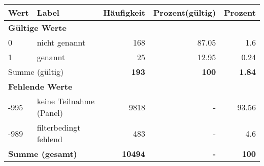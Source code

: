      \begin{longtable}{lXrrr}
     \toprule
     \textbf{Wert} & \textbf{Label} & \textbf{Häufigkeit} & \textbf{Prozent(gültig)} & \textbf{Prozent} \\
     \endhead
     \midrule
     \multicolumn{5}{l}{\textbf{Gültige Werte}}\\

     0 &
     \multicolumn{1}{X}{ nicht genannt   } &


       \num{168} &
       \num[round-mode=places,round-precision=2]{87,05} &
         \num[round-mode=places,round-precision=2]{1,6} \\

     1 &
     \multicolumn{1}{X}{ genannt   } &


       \num{25} &
       \num[round-mode=places,round-precision=2]{12,95} &
         \num[round-mode=places,round-precision=2]{0,24} \\
     \midrule
     \multicolumn{2}{l}{Summe (gültig)} &
       \textbf{\num{193}} &
     \textbf{100} &
       \textbf{\num[round-mode=places,round-precision=2]{1,84}} \\
     \multicolumn{5}{l}{\textbf{Fehlende Werte}}\\
       -995 &
       keine Teilnahme (Panel) &
         \num{9818} &
        - &
         \num[round-mode=places,round-precision=2]{93,56} \\
       -989 &
       filterbedingt fehlend &
         \num{483} &
        - &
         \num[round-mode=places,round-precision=2]{4,6} \\
     \midrule
     \multicolumn{2}{l}{\textbf{Summe (gesamt)}} &
          \textbf{\num{10494}} &
        \textbf{-} &
        \textbf{100} \\
     \bottomrule
     \end{longtable}
     
